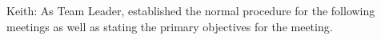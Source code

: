 Keith: As Team Leader, established the normal procedure for the following meetings as well as stating the primary objectives for the meeting.